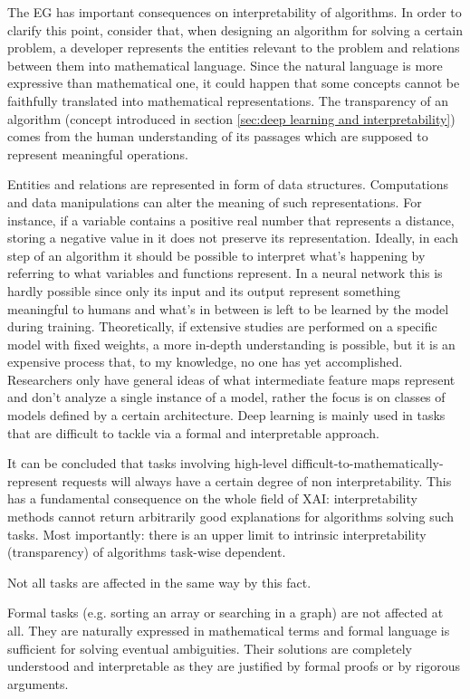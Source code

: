 The EG has important consequences on interpretability of algorithms.
In order to clarify this point, consider that, when designing an algorithm for solving a certain problem, a developer represents the entities relevant to the problem and relations between them into mathematical language.
Since the natural language is more expressive than mathematical one, it could happen that some concepts cannot be faithfully translated into mathematical representations.
The transparency of an algorithm (concept introduced in section \ref{sec:deep learning and interpretability}) comes from the human understanding of its passages which are supposed to represent meaningful operations.

Entities and relations are represented in form of data structures.
Computations and data manipulations can alter the meaning of such representations.
For instance, if a variable contains a positive real number that represents a distance, storing a negative value in it does not preserve its representation.
Ideally, in each step of an algorithm it should be possible to interpret what's happening by referring to what variables and functions represent.
In a neural network this is hardly possible since only its input and its output represent something meaningful to humans and what's in between is left to be learned by the model during training.
Theoretically, if extensive studies are performed on a specific model with fixed weights, a more in-depth understanding is possible, but it is an expensive process that, to my knowledge, no one has yet accomplished.
Researchers only have general ideas of what intermediate feature maps represent and don't analyze a single instance of a model, rather the focus is on classes of models defined by a certain architecture.
Deep learning is mainly used in tasks that are difficult to tackle via a formal and interpretable approach.

It can be concluded that tasks involving high-level difficult-to-mathematically-represent requests will always have a certain degree of non interpretability.
This has a fundamental consequence on the whole field of XAI: interpretability methods cannot return arbitrarily good explanations for algorithms solving such tasks.
Most importantly: there is an upper limit to intrinsic interpretability (transparency) of algorithms task-wise dependent.

Not all tasks are affected in the same way by this fact.

Formal tasks (e.g. sorting an array or searching in a graph) are not affected at all.
They are naturally expressed in mathematical terms and formal language is sufficient for solving eventual ambiguities.
Their solutions are completely understood and interpretable as they are justified by formal proofs or by rigorous arguments.

